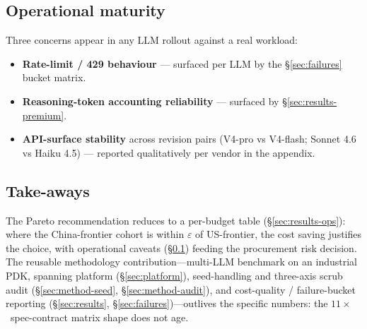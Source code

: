 \subsection{Operational maturity}
\label{sec:disc-ops}

Three concerns appear in any LLM rollout against a real workload:
\begin{itemize}
  \item \textbf{Rate-limit / 429 behaviour} --- surfaced per LLM
    by the \S\ref{sec:failures} bucket matrix.
  \item \textbf{Reasoning-token accounting reliability} ---
    surfaced by \S\ref{sec:results-premium}.
  \item \textbf{API-surface stability} across revision pairs
    (V4-pro vs V4-flash; Sonnet 4.6 vs Haiku 4.5) --- reported
    qualitatively per vendor in the appendix.
\end{itemize}

\subsection{Take-aways}
\label{sec:disc-takeaways}

The Pareto recommendation reduces to a per-budget table
(\S\ref{sec:results-ops}): where the China-frontier cohort is
within $\varepsilon$ of US-frontier, the cost saving justifies the
choice, with operational caveats (\S\ref{sec:disc-ops}) feeding the
procurement risk decision. The reusable methodology
contribution---multi-LLM benchmark on an industrial PDK,
spanning platform (\S\ref{sec:platform}), seed-handling and
three-axis scrub audit (\S\ref{sec:method-seed},
\S\ref{sec:method-audit}), and cost-quality / failure-bucket
reporting (\S\ref{sec:results}, \S\ref{sec:failures})---outlives
the specific numbers: the $11\times$~spec-contract matrix shape
does not age.
